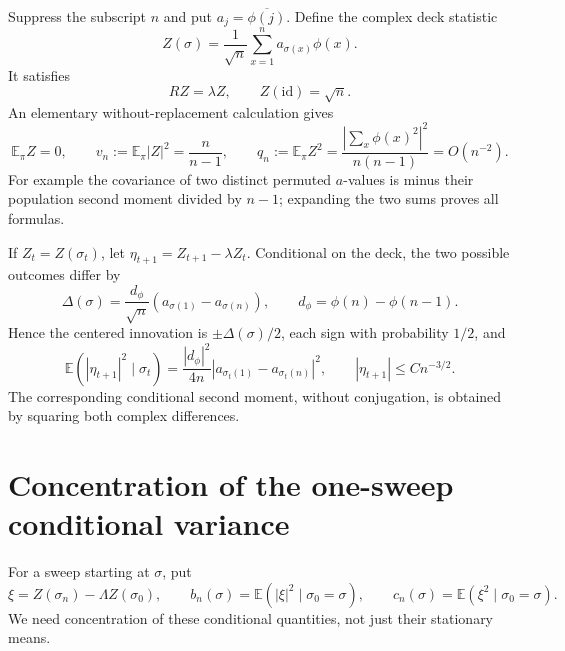 \documentclass[11pt]{article}
\theoremstyle{remark}
\newcommand{\E}{\mathbb E}
\newcommand{\id}{\mathrm{id}}
\begin{document}
Suppress the subscript $n$ and put $a_j=\overline{\phi(j)}$. Define the complex deck statistic
\begin{equation}\label{eq:score}
 Z(\sigma)=\frac1{\sqrt n}\sum_{x=1}^n a_{\sigma(x)}\phi(x).
\end{equation}
It satisfies
\[
 RZ=\lambda Z,\qquad Z(\id)=\sqrt n.
\]
An elementary without-replacement calculation gives
\begin{equation}\label{eq:stationarymoments}
 \E_\pi Z=0,\qquad v_n:=\E_\pi|Z|^2=\frac n{n-1},\qquad
 q_n:=\E_\pi Z^2=\frac{|\sum_x\phi(x)^2|^2}{n(n-1)}=O(n^{-2}).
\end{equation}
For example the covariance of two distinct permuted $a$-values is minus their population second moment divided by $n-1$; expanding the two sums proves all formulas.

If $Z_t=Z(\sigma_t)$, let $\eta_{t+1}=Z_{t+1}-\lambda Z_t$. Conditional on the deck, the two possible outcomes differ by
\[
 \Delta(\sigma)=\frac{d_\phi}{\sqrt n}
       (a_{\sigma(1)}-a_{\sigma(n)}),\qquad
 d_\phi=\phi(n)-\phi(n-1).
\]
Hence the centered innovation is $\pm\Delta(\sigma)/2$, each sign with probability $1/2$, and
\begin{equation}\label{eq:micronoise}
 \E(|\eta_{t+1}|^2\mid\sigma_t)=\frac{|d_\phi|^2}{4n}|a_{\sigma_t(1)}-a_{\sigma_t(n)}|^2,
 \qquad |\eta_{t+1}|\leq Cn^{-3/2}.
\end{equation}
The corresponding conditional second moment, without conjugation, is obtained by squaring both complex differences.

\section{Concentration of the one-sweep conditional variance}\label{sec:bracket}
For a sweep starting at $\sigma$, put
\[
 \xi=Z(\sigma_n)-\Lambda Z(\sigma_0),\qquad
 b_n(\sigma)=\E(|\xi|^2\mid\sigma_0=\sigma),\qquad
 c_n(\sigma)=\E(\xi^2\mid\sigma_0=\sigma).
\]
We need concentration of these conditional quantities, not just their stationary means.
\end{document}
